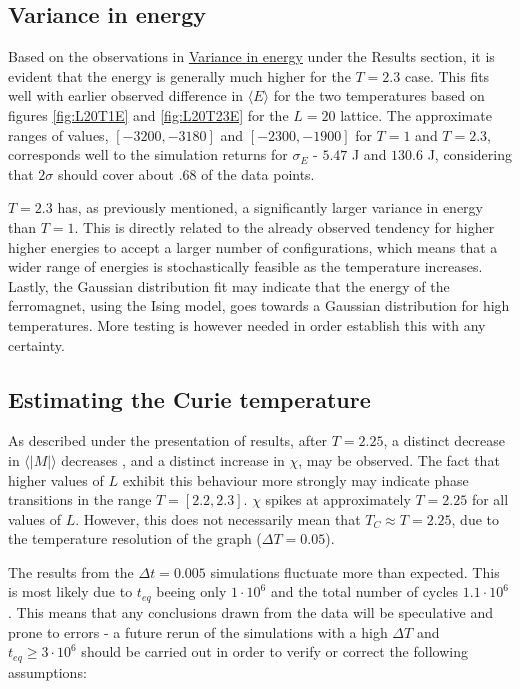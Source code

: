 \documentclass[%
oneside,                 %
final,                   %
10pt]{article}
\begin{document}
\subsection{Variance in energy}
\label{SS.disc.var}
Based on the observations in \hyperref[SS:results.VAR]{Variance in energy} under the Results section, it is evident that the energy is generally much higher for the $T=2.3$ case. This fits well with earlier observed difference in $\langle E \rangle$ for the two temperatures based on figures \ref{fig:L20T1E} and \ref{fig:L20T23E} for the $L=20$ lattice. The approximate ranges of values, $[-3200,-3180]$ and $[-2300,-1900]$ for $T=1$ and $T=2.3$, corresponds well to the simulation returns for $\sigma_E$ - $5.47$ J and $130.6$ J, considering that $2\sigma$ should cover about $.68$ of the data points.  \newline

$T=2.3$ has, as previously mentioned, a significantly larger variance in energy than $T=1$. This is directly related to the already observed tendency for higher higher energies to accept a larger number of configurations, which means that a wider range of energies is stochastically feasible as the temperature increases. Lastly, the Gaussian distribution fit may indicate that the energy of the ferromagnet, using the Ising model, goes towards a Gaussian distribution for high temperatures. More testing is however needed in order establish this with any certainty.


\subsection{Estimating the Curie temperature}
\label{SS:DR.est.curie}
As described under the presentation of results, after $T=2.25$, a distinct decrease in $\langle |M| \rangle$ decreases , and a distinct increase in $\chi$, may be observed. The fact that higher values of $L$ exhibit this behaviour more strongly may indicate phase transitions in the range $T=[2.2,2.3]$. $\chi$ spikes at approximately $T=2.25$ for all values of $L$. However, this does not necessarily mean that $T_C\approx T=2.25$, due to the temperature resolution of the graph ($\Delta T=0.05$).   \newline

The results from the $\Delta t=0.005$ simulations fluctuate more than expected. This is most likely due to $t_{eq}$ beeing only $1\cdot 10^6$ and the total number of cycles $1.1\cdot 10^6$. This means that any conclusions drawn from the data will be speculative and prone to errors - a future rerun of the simulations with a high $\Delta T$ and $t_{eq}\geq 3 \cdot 10^6$ should be carried out in order to verify or correct the following assumptions: \newline
\end{document}
